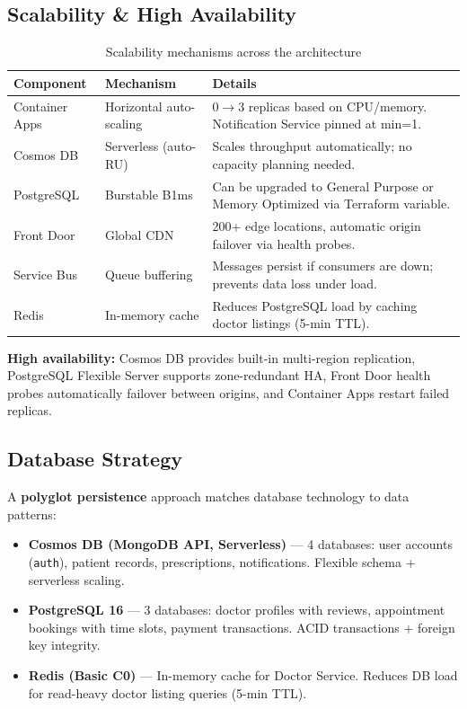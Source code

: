 \documentclass[12pt,a4paper]{article}
\begin{document}
\subsection{Scalability \& High Availability}

\begin{table}[H]
\centering
\footnotesize
\caption{Scalability mechanisms across the architecture}
\begin{tabularx}{\textwidth}{@{}l l X@{}}
\toprule
\textbf{Component} & \textbf{Mechanism} & \textbf{Details} \\
\midrule
Container Apps & Horizontal auto-scaling & 0$\to$3 replicas based on CPU/memory. Notification Service pinned at min=1. \\
Cosmos DB & Serverless (auto-RU) & Scales throughput automatically; no capacity planning needed. \\
PostgreSQL & Burstable B1ms & Can be upgraded to General Purpose or Memory Optimized via Terraform variable. \\
Front Door & Global CDN & 200+ edge locations, automatic origin failover via health probes. \\
Service Bus & Queue buffering & Messages persist if consumers are down; prevents data loss under load. \\
Redis & In-memory cache & Reduces PostgreSQL load by caching doctor listings (5-min TTL). \\
\bottomrule
\end{tabularx}
\end{table}

\noindent\textbf{High availability:} Cosmos DB provides built-in multi-region replication, PostgreSQL Flexible Server supports zone-redundant HA, Front Door health probes automatically failover between origins, and Container Apps restart failed replicas.

\subsection{Database Strategy}

A \textbf{polyglot persistence} approach matches database technology to data patterns:

\begin{itemize}[noitemsep]
    \item \textbf{Cosmos DB (MongoDB API, Serverless)} --- 4 databases: user accounts (\texttt{auth}), patient records, prescriptions, notifications. Flexible schema + serverless scaling.
    \item \textbf{PostgreSQL 16} --- 3 databases: doctor profiles with reviews, appointment bookings with time slots, payment transactions. ACID transactions + foreign key integrity.
    \item \textbf{Redis (Basic C0)} --- In-memory cache for Doctor Service. Reduces DB load for read-heavy doctor listing queries (5-min TTL).
\end{itemize}
\end{document}
